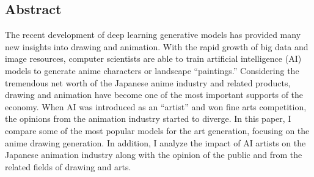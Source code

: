 \subsection*{Abstract}
The recent development of deep learning generative models has provided many new insights into drawing and animation.
With the rapid growth of big data and image resources, computer scientists are able to train artificial intelligence (AI) models to generate anime characters or landscape ``paintings.'' 
Considering the tremendous net worth of the Japanese anime industry and related products, drawing and animation have become one of the most important supports of the economy.
When AI was introduced as an ``artist'' and won fine arts competition, the opinions from the animation industry started to diverge.
In this paper, I compare some of the most popular models for the art generation, focusing on the anime drawing generation.
In addition, I analyze the impact of AI artists on the Japanese animation industry along with the opinion of the public and from the related fields of drawing and arts.

